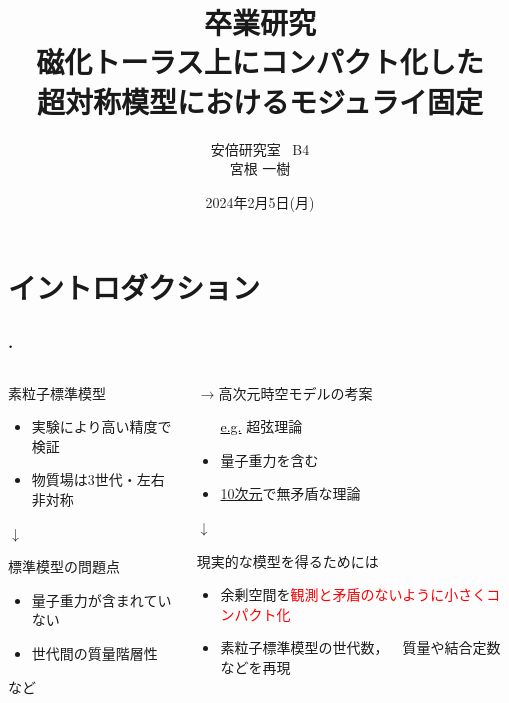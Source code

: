 \documentclass[aspectratio=169,
  a4paper,uplatex,dvipdfmx,11pt,
  xcolor = {dvipsnames,svgnames},
  hyperref ={colorlinks=true,citecolor=Navy,linkcolor=NavyBlue,urlcolor=purple}
]{beamer}
\title{
  卒業研究
  \texorpdfstring{\\}{}
  \texorpdfstring{\vspace*{5pt}}{}
  {\LARGE
    磁化トーラス上にコンパクト化した
    \\
    超対称模型におけるモジュライ固定
  }
}
\author{
  安倍研究室 \ B4
  \texorpdfstring{\\}{}
  \texorpdfstring{\vspace*{3pt}}{}
  宮根 一樹
}
\date{2024年2月5日(月)}
\begin{document}
\begin{frame}
  \titlepage
\end{frame}


\section{イントロダクション}

\begin{frame}
  \frametitle{\thesection.\ \secname}
  \begin{columns}[t]    
    \begin{column}{0.4\textwidth} 
      素粒子標準模型
      \begin{itemize}
        \item
        実験により高い精度で検証
        \item 
        物質場は3世代・左右非対称
      \end{itemize}
      \vspace*{-5pt}
      \begin{center}
        $\downarrow$
      \end{center}
      \vspace*{-5pt}
      標準模型の問題点
      \begin{itemize}
        \item 
        量子重力が含まれていない
        \item 
        世代間の質量階層性
      \end{itemize}
      など    
    \end{column}
    \begin{column}{0.4\textwidth}  

      \vspace*{-1.2cm}

      $\longrightarrow$高次元時空モデルの考案    
      \begin{itemize}
        \item[\textcolor{black}{\uline{e.g.}}]    
        超弦理論    
        \item 
        量子重力を含む
        \item 
        \uline{10次元}で無矛盾な理論
      \end{itemize}      
      \vspace*{-5pt}
      \begin{center}
        $\downarrow$
      \end{center}
      \vspace*{-5pt}
      現実的な模型を得るためには
      \begin{itemize}
        \item 
        余剰空間を\textcolor{red}{観測と矛盾のないように小さくコンパクト化}
        \item 
        素粒子標準模型の世代数，\ \ 質量や結合定数などを再現
      \end{itemize}
    \end{column}
  \end{columns}
\end{frame}
\end{document}
